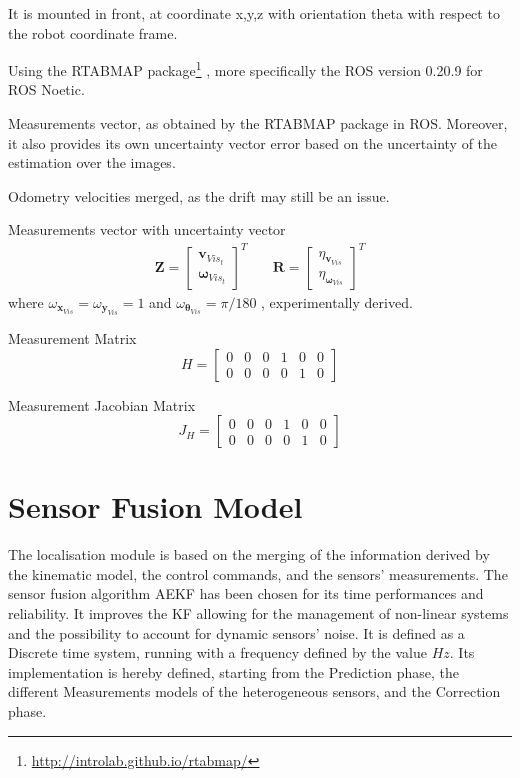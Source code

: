 It is mounted in front, at coordinate x,y,z with orientation theta with respect to the robot coordinate frame.

Using the \gls{RTABMAP} package\footnote{\url{http://introlab.github.io/rtabmap/}}\cite{6094602} \cite{labbe_rtab-map_2019}, more specifically the \gls{ROS} version 0.20.9 for \gls{ROS} Noetic.


\noindent 
Measurements vector, as obtained by the \gls{RTABMAP} package in \gls{ROS}.
Moreover, it also provides its own uncertainty vector error based on the uncertainty of the estimation over the images.

Odometry velocities merged, as the drift may still be an issue.


Measurements vector with uncertainty vector
\begin{align}
\mathbf{Z}
=
\begin{bmatrix}
\mathbf{v}_{Vis_t} \\
\boldsymbol \omega_{Vis_t}
\end{bmatrix}^T
& \quad
\mathbf{R}
=
\begin{bmatrix}
\eta_{\mathbf{v}_{Vis}} \\
\eta_{\boldsymbol \omega_{Vis}}
\end{bmatrix}^T
\end{align}
where $ \omega_{\mathbf{x}_{Vis}} = \omega_{\mathbf{y}_{Vis}} = 1$ and
$ \omega_{\boldsymbol \theta_{Vis}} = \pi/180 $ , experimentally derived.


Measurement Matrix
\begin{equation}
H
=
\begin{bmatrix}
0 & 0 & 0 & 1 & 0 & 0 \\
0 & 0 & 0 & 0 & 1 & 0
\end{bmatrix}
\end{equation}

Measurement Jacobian Matrix
\begin{equation}
J_H
=
\begin{bmatrix}
0 & 0 & 0 & 1 & 0 & 0 \\
0 & 0 & 0 & 0 & 1 & 0
\end{bmatrix}
\end{equation}


\section{Sensor Fusion Model}
\label{sec:locConf}
\noindent
The localisation module is based on the merging of the information derived by the kinematic model, the control commands, and the sensors' measurements.
The sensor fusion algorithm \gls{AEKF} has been chosen for its time performances and reliability.
It improves the \gls{KF} allowing for the management of non-linear systems and the possibility to account for dynamic sensors' noise.
It is defined as a Discrete time system, running with a frequency defined by the value $Hz$.
Its implementation is hereby defined, starting from the Prediction phase, the different Measurements models of the heterogeneous sensors, and the Correction phase.


